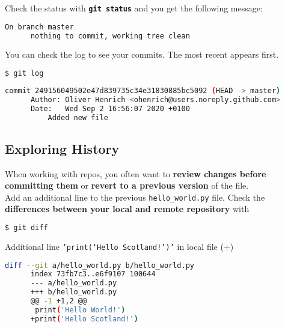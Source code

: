 \begin{frame}[fragile]
\emptyframetitle

  Check the status with \texttt{\textbf{git status}} and you get the following message:

  \begin{block}{}
    \begin{lstlisting}[language=bash]
      On branch master
      nothing to commit, working tree clean
    \end{lstlisting}
  \end{block}

  You can check the log to see your commits. The most recent appears first.

    \begin{lstlisting}[language=bash]
      $ git log
    \end{lstlisting}

  \begin{block}{}
    \begin{lstlisting}[language=bash]
      commit 249156049502e47d839735c34e31830885bc5092 (HEAD -> master)
      Author: Oliver Henrich <ohenrich@users.noreply.github.com>
      Date:   Wed Sep 2 16:56:07 2020 +0100
          Added new file
      \end{lstlisting}
  \end{block}
 
\end{frame}

\subsection{Exploring History}\hypertarget{sec2.4}{}

\begin{frame}[fragile]
\emptyframetitle

  When working with repos, you often want to \textbf{review changes before committing them} or \textbf{revert to a previous version} of the file.\\[0.25cm]

  Add an additional line to the previous \texttt{hello\_world.py} file. Check the \textbf{differences between your local and remote repository} with

  \begin{lstlisting}[language=bash]
    $ git diff
  \end{lstlisting}

  \begin{block}{Additional line \texttt{'print(`Hello Scotland!')'} in local file (+)}
    \begin{lstlisting}[language=bash]
      diff --git a/hello_world.py b/hello_world.py
      index 73fb7c3..e6f9107 100644
      --- a/hello_world.py
      +++ b/hello_world.py
      @@ -1 +1,2 @@
       print('Hello World!')
      +print('Hello Scotland!')
    \end{lstlisting}
  \end{block}

\end{frame}

